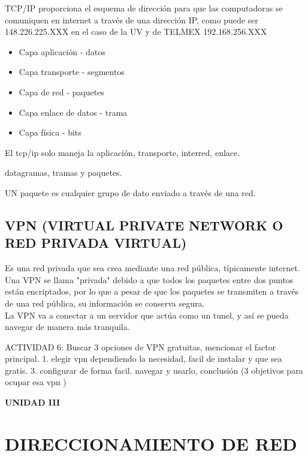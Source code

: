 \documentclass[letterpaper,12pt]{article}
\begin{document}
\begin{sloppypar}
TCP/IP proporciona el esquema de dirección para que las computadoras se comuniquen en internet a través de una dirección IP, como puede ser 148.226.225.XXX en el caso de la UV y de TELMEX 192.168.256.XXX

\begin{itemize}
    \item Capa aplicación - datos
    \item Capa transporte - segmentos
    \item Capa de red - paquetes
    \item Capa enlace de datos - trama
    \item Capa física - bits 
\end{itemize}

El tcp/ip solo maneja la aplicación, transporte, interred, enlace.  

datagramas, tramas y paquetes.

UN paquete es cualquier grupo de dato enviado a través de una red.

\subsection{VPN (VIRTUAL PRIVATE NETWORK O RED PRIVADA VIRTUAL)}
Es una red privada que sea crea mediante una red pública, típicamente internet.
\vspace{0.3cm}\\ 
Una VPN se llama "privada" debido a que todos los paquetes entre dos puntos están encriptados, por lo que a pesar de que los paquetes se transmiten a través de una red pública, su información se conserva segura.
\vspace{0.3cm}\\ 
La VPN va a conectar a un servidor que actúa como un tunel, y así se pueda navegar de manera más tranquila.

ACTIVIDAD 6: Buscar 3 opciones de VPN gratuitas, mencionar el factor principal. 1. elegir vpn dependiendo la necesidad, facil de instalar y que sea gratis. 3. configurar de forma facil. navegar y usarlo, conclusión (3 objetivos para ocupar esa vpn )
\newpage 
\begin{center}
    \textbf{\LARGE{UNIDAD III}}
\end{center}
\section{DIRECCIONAMIENTO DE RED}

\end{sloppypar}
\end{document}
